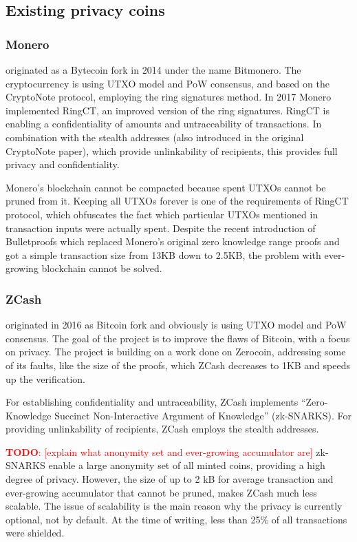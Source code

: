 \documentclass[a4paper, 10pt, conference]{ieeeconf}
\newcommand\todo[1]{\textcolor{red}{\textbf{TODO}: [#1]}}
\begin{document}
\subsection{Existing privacy coins}

\subsubsection{Monero} originated as a Bytecoin fork in 2014 under the name Bitmonero. The cryptocurrency is using UTXO model and PoW consensus, and based on the CryptoNote protocol\cite{c2}, employing the ring signatures method. In 2017 Monero implemented RingCT\cite{c3}, an improved version of the ring signatures. RingCT is enabling a confidentiality of amounts and untraceability of transactions. In combination with the stealth addresses (also introduced in the original CryptoNote paper), which provide unlinkability of recipients, this provides full privacy and confidentiality.

Monero's blockchain cannot be compacted because spent UTXOs cannot be pruned from it. Keeping all UTXOs forever is one of the requirements of RingCT protocol, which obfuscates the fact which particular UTXOs mentioned in transaction inputs were actually spent. 
Despite the recent introduction of Bulletproofs\cite{c4} which replaced Monero's original zero knowledge range proofs and got a simple transaction size from 13KB down to 2.5KB, the problem with ever-growing blockchain cannot be solved. 

\subsubsection{ZCash} originated in 2016 as Bitcoin fork and obviously is using UTXO model and PoW consensus. The goal of the project is to improve the flaws of Bitcoin, with a focus on privacy. The project is building on a work done on Zerocoin\cite{c5}, addressing some of its faults, like the size of the proofs, which ZCash decreases to 1KB and speeds up the verification.

For establishing confidentiality and untraceability, ZCash implements ``Zero-Knowledge Succinct Non-Interactive Argument of Knowledge'' (zk-SNARKS)\cite{c6}. For providing unlinkability of recipients, ZCash employs the stealth addresses.

\todo{explain what anonymity set and ever-growing accumulator are}
zk-SNARKS enable a large anonymity set of all minted coins, providing a high degree of privacy. However, the size of up to 2 kB for average transaction and ever-growing accumulator that cannot be pruned, makes ZCash much less scalable. The issue of scalability is the main reason why the privacy is currently optional, not by default. At the time of writing, less than 25\% of all transactions were shielded.
\end{document}
